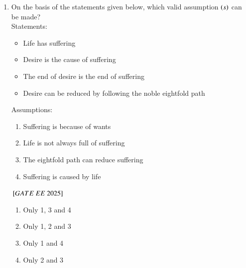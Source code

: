 \documentclass[journal,12pt,onecolumn]{IEEEtran}
\theoremstyle{remark}
\begin{document}
\begin{enumerate}
   \item On the basis of the statements given below, which valid assumption $\left(s\right)$ can be
made? \\  
      Statements:
\begin{itemize}
    \item Life has suffering
    \item Desire is the cause of suffering
    \item The end of desire is the end of suffering
    \item Desire can be reduced by following the noble eightfold path
\end{itemize}
Assumptions:
\begin{enumerate}
    \item Suffering is because of wants
    \item Life is not always full of suffering
    \item The eightfold path can reduce suffering
    \item Suffering is caused by life
\end{enumerate}    
${}\left[GATE\ EE\ 2025\right]$ \\
    \begin{enumerate}[label=(\Alph*)]
 \item Only 1, 3 and 4 \\
\item Only 1, 2 and 3 \\
\item Only 1 and 4 \\
\item Only 2 and 3 \\
    \end{enumerate}


\end{enumerate}
\end{document}
